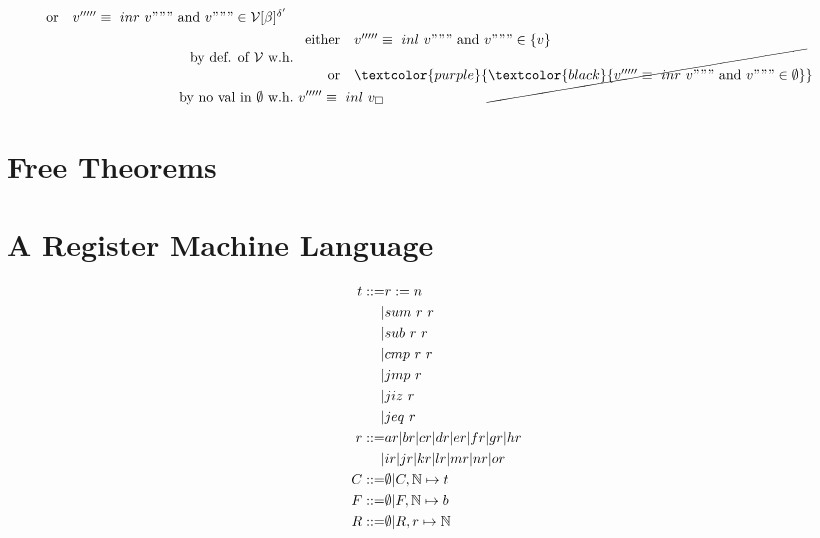\documentclass{article}
\begin{document}
\begin{align*}
\begin{array}{rl}
    \text{or} & v'''''\equiv \inr v""" \AND v"""\in\V[\beta]^{\delta'}\end{array} \\
        \text{by def. of $\V$ w.h.}  &\ \begin{array}{rl}\text{either}&v'''''\equiv \inl v""" \AND v"""\in \{v\} \\
        \text{or} & \textcolor{purple}{\cancel{\textcolor{black}{v'''''\equiv \inr v""" \AND v"""\in \emptyset}}}\end{array} \\
            \text{by no val in $\emptyset$ w.h.} &\ v'''''\equiv \inl v _\square\\
        \end{align*}

\section{Free Theorems}
\section{A Register Machine Language}
\begin{align*}
    t ::= & r:=n \\
        |& sum\ r\ r \\
        |& sub\ r\ r \\
        |& cmp\ r\ r \\
        |& jmp\ r \\
        |& jiz\ r \\
        |& jeq\ r \\
    r ::= & ar|br|cr|dr|er|fr|gr|hr \\
        |&ir|jr|kr|lr|mr|nr|or \\
    C ::=& \emptyset | C,\N\mapsto t \\
    F ::=& \emptyset | F,\N\mapsto b \\
    R ::=& \emptyset | R, r\mapsto \N \\
\end{align*}
\end{document}
